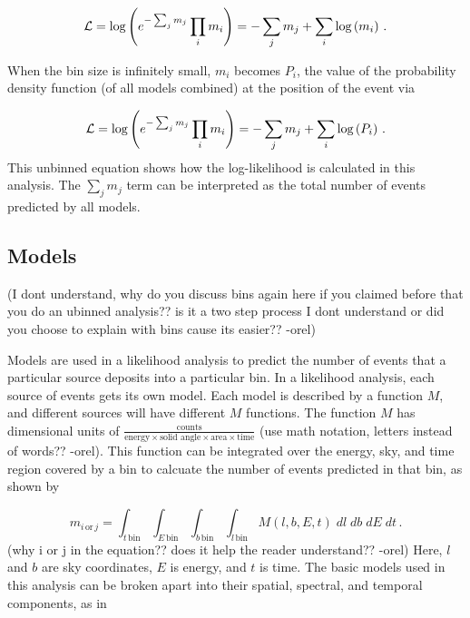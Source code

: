   \begin{equation}\label{eqn:simple_like_7}
    \mathcal{L} = \textrm{log} \left ( e^{- \sum_j m_j} \prod_i m_i \right ) = - \sum_j m_j + \sum_i \textrm{log} \left ( m_i \right ) \,.
  \end{equation}
  
  When the bin size is infinitely small, $m_i$ becomes $P_i$, the value of the probability density function (of all models combined) at the position of the event via
  
  \begin{equation}\label{eqn:simple_like_8}
    \mathcal{L} = \textrm{log} \left ( e^{- \sum_j m_j} \prod_i m_i \right ) = - \sum_j m_j + \sum_i \textrm{log} \left ( P_i \right ) \,.
  \end{equation}
  This unbinned equation shows how the log-likelihood is calculated in this analysis.
  The $\sum_{j} m_{j}$ term can be interpreted as the total number of events predicted by all models.
  
  \subsection{Models}\label{sec:model_irf_folding}
  
  {\color{red}(I dont understand, why do you discuss bins again here if you claimed before that you do an ubinned analysis?? is it a two step process I dont understand or did you choose to explain with bins cause its easier?? -orel)}
  
  Models are used in a likelihood analysis to predict the number of events that a particular source deposits into a particular bin.
  In a likelihood analysis, each source of events gets its own model.
  Each model is described by a function $M$, and different sources will have different $M$ functions.
  The function $M$ has dimensional units of $\frac{\textrm{counts}}{\textrm{energy}\times\textrm{solid angle}\times\textrm{area}\times\textrm{time}}$ {\color{red}(use math notation, letters instead of words?? -orel)}.
  This function can be integrated over the energy, sky, and time region covered by a bin to calcuate the number of events predicted in that bin, as shown by 
  
  \begin{equation}\label{eqn:model_int}
    m_{i \, \textrm{or} \, j} = \int_{t\,\textrm{bin}} \int_{E\,\textrm{bin}} \int_{b\,\textrm{bin}} \int_{l\,\textrm{bin}} M(l,b,E,t)\; dl \; db \; dE \; dt \,.
  \end{equation}
  {\color{red}(why i or j in the equation?? does it help the reader understand?? -orel)}
  Here, $l$ and $b$ are sky coordinates, $E$ is energy, and $t$ is time.
  The basic models used in this analysis can be broken apart into their spatial, spectral, and temporal components, as in

